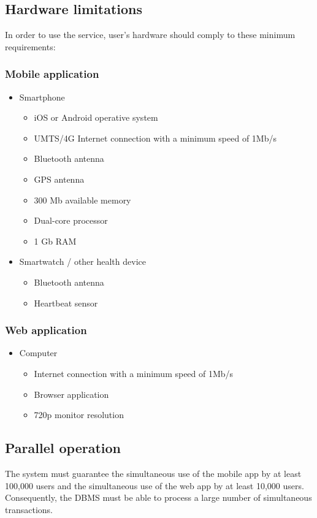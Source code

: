 \subsection{Hardware limitations}
In order to use the service, user’s hardware should comply to these minimum requirements:
\subsubsection{Mobile application}
\begin{itemize}
  \item Smartphone
  \begin{itemize}
    \item iOS or Android operative system
    \item UMTS/4G Internet connection with a minimum speed of 1Mb/s
    \item Bluetooth antenna
    \item GPS antenna
    \item 300 Mb available memory
    \item Dual-core processor
    \item 1 Gb RAM
  \end{itemize}
  \item Smartwatch / other health device
  \begin{itemize}
    \item Bluetooth antenna
    \item Heartbeat sensor
  \end{itemize}
\end{itemize}

\subsubsection{Web application}
\begin{itemize}
  \item Computer
  \begin{itemize}
    \item Internet connection with a minimum speed of 1Mb/s
    \item Browser application
    \item 720p monitor resolution
  \end{itemize}
\end{itemize}

\subsection{Parallel operation}
The system must guarantee the simultaneous use of the mobile app by at least 100,000 users and the simultaneous use of the web app by at least 10,000 users.
Consequently, the DBMS must be able to process a large number of simultaneous transactions.

